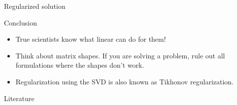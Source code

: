\documentclass[notes]{beamer}
\begin{document}
  \begin{frame}{Regularized solution}
    \begin{figure}
      
    \end{figure}
  \end{frame}

  \begin{frame}{Conclusion}
    \begin{itemize}
      \item True scientists know what linear can do for them!
      \item Think about matrix shapes. If you are solving a problem, rule out all formulations where the shapes don't work.
      \item Regularization using the SVD is also known as Tikhonov regularization.
    \end{itemize}
  \end{frame}

  \begin{frame}{Literature}
    \printbibliography
  \end{frame}
\end{document}
